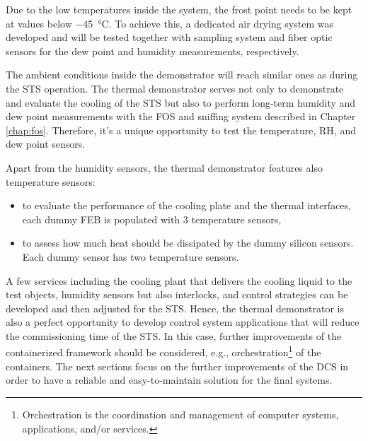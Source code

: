  Due to the low temperatures inside the system, the frost point needs to be kept at values below \SI{-45}{\celsius}. To achieve this, a dedicated air drying system was developed and will be tested together with sampling system and fiber optic sensors for the dew point and humidity measurements, respectively. 
 
 The ambient conditions inside the demonstrator will reach similar ones as during the \gls{STS} operation. The thermal demonstrator serves not only to demonstrate and evaluate the cooling of the \gls{STS} but also to perform long-term humidity and dew point measurements with the \gls{FOS} and sniffing system described in Chapter \ref{chap:fos}. Therefore, it's a unique opportunity to test the temperature, RH, and dew point sensors.
 
 Apart from the humidity sensors, the thermal demonstrator features also temperature sensors:
 \begin{itemize}
     \item to evaluate the performance of the cooling plate and the thermal interfaces, each dummy \gls{FEB} is populated with 3 temperature sensors,
     \item to assess how much heat should be dissipated by the dummy silicon sensors. Each dummy sensor has two temperature sensors.
 \end{itemize}



A few services including the cooling plant that delivers the cooling liquid to the test objects, humidity sensors but also interlocks, and control strategies can be developed and then adjusted for the \gls{STS}. Hence, the thermal demonstrator is also a perfect opportunity to develop control system applications that will reduce the commissioning time of the \gls{STS}. In this case, further improvements of the containerized framework should be considered, e.g., orchestration\footnote{Orchestration is the coordination and management of computer systems, applications, and/or services.} of the containers. The next sections focus on the further improvements of the \gls{DCS} in order to have a reliable and easy-to-maintain solution for the final systems. 